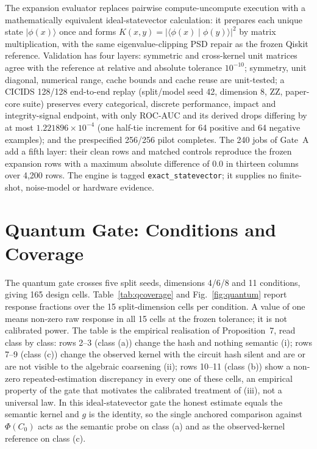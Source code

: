 \documentclass[10pt,journal,compsoc]{IEEEtran}
\begin{document}
The expansion evaluator replaces pairwise compute-uncompute execution with a
mathematically equivalent ideal-statevector calculation: it prepares each
unique state $\lvert\phi(x)\rangle$ once and forms
$K(x,y)=\left|\langle\phi(x)\mid\phi(y)\rangle\right|^2$ by matrix
multiplication, with the same eigenvalue-clipping PSD repair as the frozen
Qiskit reference. Validation has four layers: symmetric and cross-kernel
unit matrices agree with the reference at relative and absolute tolerance
$10^{-10}$; symmetry, unit diagonal, numerical range, cache bounds and cache
reuse are unit-tested; a CICIDS 128/128 end-to-end replay (split/model seed
42, dimension 8, ZZ, paper-core suite) preserves every categorical, discrete
performance, impact and integrity-signal endpoint, with only ROC-AUC and its
derived drops differing by at most $1.221896\times10^{-4}$ (one half-tie
increment for 64 positive and 64 negative examples); and the prespecified
256/256 pilot completes. The 240 jobs of Gate~A add a fifth layer: their
clean rows and matched controls reproduce the frozen expansion rows with a
maximum absolute difference of $0.0$ in thirteen columns over 4,200 rows. The
engine is tagged \texttt{exact\_statevector}; it supplies no finite-shot,
noise-model or hardware evidence.

\section{Quantum Gate: Conditions and Coverage}

The quantum gate crosses five split seeds, dimensions 4/6/8 and 11
conditions, giving 165 design cells. Table~\ref{tab:qcoverage} and
Fig.~\ref{fig:quantum} report response fractions over the 15 split-dimension
cells per condition. A value of one means non-zero raw response in all 15
cells at the frozen tolerance; it is not calibrated power. The table is the
empirical realisation of
Proposition~7, read class by class: rows 2--3 (class (a)) change the hash
and nothing semantic (i); rows 7--9 (class (c)) change the observed kernel
with the circuit hash silent and are or are not visible to the algebraic
coarsening (ii); rows 10--11 (class (b)) show a non-zero
repeated-estimation discrepancy in every one of these cells, an empirical
property of the gate that motivates the calibrated treatment of (iii), not
a universal law. In this ideal-statevector gate the honest estimate equals
the semantic kernel and $g$ is the identity, so the single anchored
comparison against $\Phi(C_0)$ acts as the semantic probe on class (a) and as
the observed-kernel reference on class (c).
\end{document}
